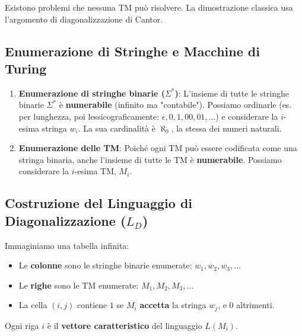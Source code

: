 \documentclass[a4paper]{article}
\theoremstyle{definition} %
\theoremstyle{remark} %
\begin{document}
Esistono problemi che nessuna TM può risolvere. La dimostrazione classica usa l'argomento di diagonalizzazione di Cantor.

\subsection{Enumerazione di Stringhe e Macchine di Turing}

\begin{enumerate}
    \item \textbf{Enumerazione di stringhe binarie ($\Sigma^*$)}: L'insieme di tutte le stringhe binarie $\Sigma^*$ è \textbf{numerabile} (infinito ma "contabile"). Possiamo ordinarle (es. per lunghezza, poi lessicograficamente: $\epsilon, 0, 1, 00, 01, \dots$) e considerare la $i$-esima stringa $w_i$. La sua cardinalità è $\aleph_0$, la stessa dei numeri naturali.
    \item \textbf{Enumerazione delle TM}: Poiché ogni TM può essere codificata come una stringa binaria, anche l'insieme di tutte le TM è \textbf{numerabile}. Possiamo considerare la $i$-esima TM, $M_i$.
\end{enumerate}

\subsection{Costruzione del Linguaggio di Diagonalizzazione ($L_D$)}
Immaginiamo una tabella infinita:
\begin{itemize}
    \item Le \textbf{colonne} sono le stringhe binarie enumerate: $w_1, w_2, w_3, \dots$
    \item Le \textbf{righe} sono le TM enumerate: $M_1, M_2, M_3, \dots$
    \item La cella $(i, j)$ contiene $1$ se $M_i$ \textbf{accetta} la stringa $w_j$, e $0$ altrimenti.
\end{itemize}

Ogni riga $i$ è il \textbf{vettore caratteristico} del linguaggio $L(M_i)$.
\end{document}
